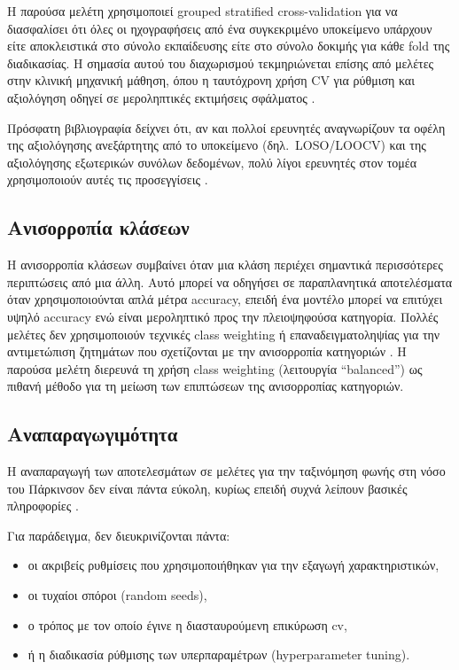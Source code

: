 Η παρούσα μελέτη χρησιμοποιεί grouped stratified cross-validation για να διασφαλίσει ότι όλες οι ηχογραφήσεις από ένα συγκεκριμένο υποκείμενο υπάρχουν είτε αποκλειστικά στο σύνολο εκπαίδευσης είτε στο σύνολο δοκιμής για κάθε fold της διαδικασίας. Η σημασία αυτού του διαχωρισμού τεκμηριώνεται επίσης από μελέτες στην κλινική μηχανική μάθηση, όπου η ταυτόχρονη χρήση CV για ρύθμιση και αξιολόγηση οδηγεί σε μεροληπτικές εκτιμήσεις σφάλματος \citep{varma2006nestedcv, cawley2010overfitting}.

Πρόσφατη βιβλιογραφία δείχνει ότι, αν και πολλοί ερευνητές αναγνωρίζουν τα οφέλη της αξιολόγησης ανεξάρτητης από το υποκείμενο (δηλ.\ LOSO/LOOCV) και της αξιολόγησης εξωτερικών συνόλων δεδομένων, πολύ λίγοι ερευνητές στον τομέα χρησιμοποιούν αυτές τις προσεγγίσεις \citep{sedigh_malekroodi2025voice}.

\subsection{Ανισορροπία κλάσεων}

Η ανισορροπία κλάσεων συμβαίνει όταν μια κλάση περιέχει σημαντικά περισσότερες περιπτώσεις από μια άλλη. Αυτό μπορεί να οδηγήσει σε παραπλανητικά αποτελέσματα όταν χρησιμοποιούνται απλά μέτρα accuracy, επειδή ένα μοντέλο μπορεί να επιτύχει υψηλό accuracy ενώ είναι μεροληπτικό προς την πλειοψηφούσα κατηγορία. Πολλές μελέτες δεν χρησιμοποιούν τεχνικές class weighting ή επαναδειγματοληψίας για την αντιμετώπιση ζητημάτων που σχετίζονται με την ανισορροπία κατηγοριών \citep{sedigh_malekroodi2025voice}. Η παρούσα μελέτη διερευνά τη χρήση class weighting (λειτουργία ``balanced'') ως πιθανή μέθοδο για τη μείωση των επιπτώσεων της ανισορροπίας κατηγοριών.

\subsection{Αναπαραγωγιμότητα}

Η αναπαραγωγή των αποτελεσμάτων σε μελέτες για την ταξινόμηση φωνής στη νόσο του Πάρκινσον δεν είναι πάντα εύκολη, κυρίως επειδή συχνά λείπουν βασικές πληροφορίες \citep{ge2023inflation}.

Για παράδειγμα, δεν διευκρινίζονται πάντα:

\begin{itemize}
    \item οι ακριβείς ρυθμίσεις που χρησιμοποιήθηκαν για την εξαγωγή χαρακτηριστικών,
    \item οι τυχαίοι σπόροι (random seeds),
    \item ο τρόπος με τον οποίο έγινε η διασταυρούμενη επικύρωση \gls{cv},
    \item ή η διαδικασία ρύθμισης των υπερπαραμέτρων (hyperparameter tuning).
\end{itemize}

